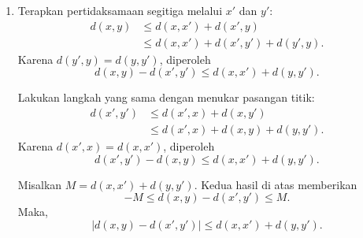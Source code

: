 \documentclass[11pt,a4paper]{article}
\begin{document}
\begin{enumerate}[itemsep=12pt,parsep=5pt]
  \item Terapkan pertidaksamaan segitiga melalui $x'$ dan $y'$:
        \begin{align*}
          d(x,y)
           & \le d(x,x')+d(x',y)           \\
           & \le d(x,x')+d(x',y')+d(y',y).
        \end{align*}
        Karena $d(y',y)=d(y,y')$, diperoleh
        \[
          d(x,y)-d(x',y')\le d(x,x')+d(y,y').
        \]

        Lakukan langkah yang sama dengan menukar pasangan titik:
        \begin{align*}
          d(x',y')
           & \le d(x',x)+d(x,y')         \\
           & \le d(x',x)+d(x,y)+d(y,y').
        \end{align*}
        Karena $d(x',x)=d(x,x')$, diperoleh
        \[
          d(x',y')-d(x,y)\le d(x,x')+d(y,y').
        \]

        Misalkan $M=d(x,x')+d(y,y')$.
        Kedua hasil di atas memberikan
        \[
          -M\le d(x,y)-d(x',y')\le M.
        \]
        Maka,
        \[
          |d(x,y)-d(x',y')|\le d(x,x')+d(y,y').
        \]
\end{enumerate}
\end{document}
